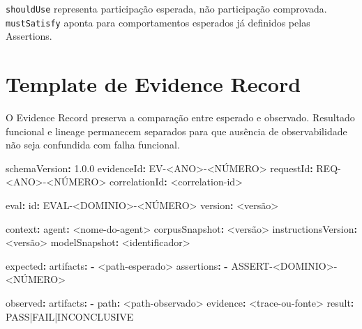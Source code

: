 \documentclass[
  10pt,
  a4paper,
  oneside]{book}
\newenvironment{Shaded}{}{}
\newcommand{\AttributeTok}[1]{\textcolor[rgb]{0.49,0.56,0.16}{#1}}
\newcommand{\FloatTok}[1]{\textcolor[rgb]{0.25,0.63,0.44}{#1}}
\newcommand{\FunctionTok}[1]{\textcolor[rgb]{0.02,0.16,0.49}{#1}}
\newcommand{\KeywordTok}[1]{\textcolor[rgb]{0.00,0.44,0.13}{\textbf{#1}}}
\renewenvironment{Shaded}{\begin{snugshade}}{\end{snugshade}}%
\begin{document}
\texttt{shouldUse} representa participação esperada, não participação
comprovada. \texttt{mustSatisfy} aponta para comportamentos esperados já
definidos pelas Assertions.

\hypertarget{template-de-evidence-record}{%
\section{Template de Evidence
Record}\label{template-de-evidence-record}}

O Evidence Record preserva a comparação entre esperado e observado.
Resultado funcional e lineage permanecem separados para que ausência de
observabilidade não seja confundida com falha funcional.

\begin{Shaded}
\begin{Highlighting}[]
\FunctionTok{schemaVersion}\KeywordTok{:}\AttributeTok{ }\FloatTok{1.0.0}
\FunctionTok{evidenceId}\KeywordTok{:}\AttributeTok{ EV{-}\textless{}ANO\textgreater{}{-}\textless{}NÚMERO\textgreater{}}
\FunctionTok{requestId}\KeywordTok{:}\AttributeTok{ REQ{-}\textless{}ANO\textgreater{}{-}\textless{}NÚMERO\textgreater{}}
\FunctionTok{correlationId}\KeywordTok{:}\AttributeTok{ \textless{}correlation{-}id\textgreater{}}

\FunctionTok{eval}\KeywordTok{:}
\AttributeTok{  }\FunctionTok{id}\KeywordTok{:}\AttributeTok{ EVAL{-}\textless{}DOMINIO\textgreater{}{-}\textless{}NÚMERO\textgreater{}}
\AttributeTok{  }\FunctionTok{version}\KeywordTok{:}\AttributeTok{ \textless{}versão\textgreater{}}

\FunctionTok{context}\KeywordTok{:}
\AttributeTok{  }\FunctionTok{agent}\KeywordTok{:}\AttributeTok{ \textless{}nome{-}do{-}agent\textgreater{}}
\AttributeTok{  }\FunctionTok{corpusSnapshot}\KeywordTok{:}\AttributeTok{ \textless{}versão\textgreater{}}
\AttributeTok{  }\FunctionTok{instructionsVersion}\KeywordTok{:}\AttributeTok{ \textless{}versão\textgreater{}}
\AttributeTok{  }\FunctionTok{modelSnapshot}\KeywordTok{:}\AttributeTok{ \textless{}identificador\textgreater{}}

\FunctionTok{expected}\KeywordTok{:}
\AttributeTok{  }\FunctionTok{artifacts}\KeywordTok{:}
\AttributeTok{    }\KeywordTok{{-}}\AttributeTok{ \textless{}path{-}esperado\textgreater{}}
\AttributeTok{  }\FunctionTok{assertions}\KeywordTok{:}
\AttributeTok{    }\KeywordTok{{-}}\AttributeTok{ ASSERT{-}\textless{}DOMINIO\textgreater{}{-}\textless{}NÚMERO\textgreater{}}

\FunctionTok{observed}\KeywordTok{:}
\AttributeTok{  }\FunctionTok{artifacts}\KeywordTok{:}
\AttributeTok{    }\KeywordTok{{-}}\AttributeTok{ }\FunctionTok{path}\KeywordTok{:}\AttributeTok{ \textless{}path{-}observado\textgreater{}}
\AttributeTok{      }\FunctionTok{evidence}\KeywordTok{:}\AttributeTok{ \textless{}trace{-}ou{-}fonte\textgreater{}}
\AttributeTok{      }\FunctionTok{result}\KeywordTok{:}\AttributeTok{ PASS|FAIL|INCONCLUSIVE}


\end{Highlighting}
\end{Shaded}
\end{document}
